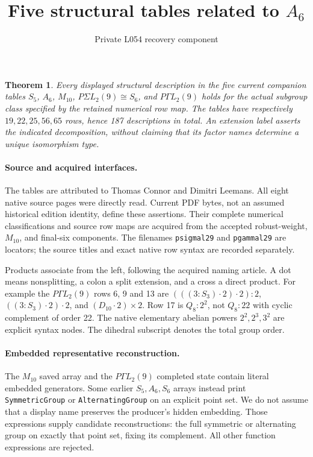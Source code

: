 \documentclass[11pt]{article}
\title{Five structural tables related to $A_6$}
\author{Private L054 recovery component}\date{}
\newtheorem{theorem}{Theorem}
\begin{document}
\maketitle
\begin{theorem}
Every displayed structural description in the five current companion
tables $S_5$, $A_6$, $M_{10}$, $P\Sigma L_2(9)\cong S_6$, and
$P\Gamma L_2(9)$ holds for the actual subgroup class specified by the
retained numerical row map. The tables have respectively
$19,22,25,56,65$ rows, hence 187 descriptions in total.
An extension label asserts the indicated decomposition, without claiming
that its factor names determine a unique isomorphism type.
\end{theorem}

\paragraph{Source and acquired interfaces.}
The tables are attributed to Thomas Connor and Dimitri Leemans. All eight
native source pages were directly read. Current PDF bytes, not an assumed
historical edition identity, define these assertions. Their complete
numerical classifications and source row maps are acquired from the
accepted robust-weight, $M_{10}$, and final-six components. The filenames
\texttt{psigmal29} and \texttt{pgammal29} are locators; the source titles
and exact native row syntax are recorded separately.

Products associate from the left, following the acquired naming article.
A dot means nonsplitting, a colon a split extension, and a cross a direct
product. For example the $P\Gamma L_2(9)$ rows 6, 9 and 13 are
$(((3:S_3)\mathbin{\cdot}2)\mathbin{\cdot}2):2$,
$((3:S_3)\mathbin{\cdot}2)\mathbin{\cdot}2$, and
$(D_{10}\mathbin{\cdot}2)\times2$.
Row 17 is $Q_8:2^2$, not $Q_8:22$ with cyclic complement of order 22.
The native elementary abelian powers $2^2,2^3,3^2$ are explicit syntax
nodes. The dihedral subscript denotes the total group order.

\paragraph{Embedded representative reconstruction.}
The $M_{10}$ saved array and the $P\Gamma L_2(9)$ completed state contain
literal embedded generators. Some earlier $S_5,A_6,S_6$ arrays instead
print \texttt{SymmetricGroup} or \texttt{AlternatingGroup} on an explicit
point set. We do not assume that a display name preserves the producer's
hidden embedding. Those expressions supply candidate reconstructions:
the full symmetric or alternating group on exactly that point set,
fixing its complement. All other function expressions are rejected.
\end{document}
